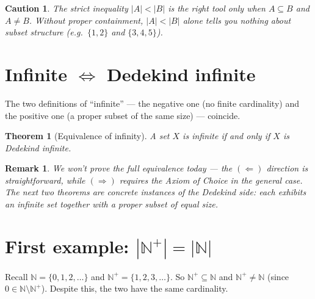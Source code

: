 \documentclass[11pt]{article}
\theoremstyle{defstyle}
\theoremstyle{thmstyle}
\newtheorem{theorem}{Theorem}[section]
\theoremstyle{notstyle}
\newtheorem*{remark}{Remark}
\theoremstyle{cautionstyle}
\newtheorem*{caution}{Caution}
\newcommand{\N}{\mathbb{N}}
\newcommand{\Np}{\mathbb{N}^{+}}
\begin{document}
\begin{cautionbox}
\begin{caution}
The strict inequality $|A| < |B|$ is the right tool only when $A \subseteq B$ and $A \neq B$. Without proper containment, $|A| < |B|$ alone tells you nothing about subset structure (e.g.\ $\{1,2\}$ and $\{3,4,5\}$).
\end{caution}
\end{cautionbox}

\section{Infinite \texorpdfstring{$\iff$}{iff} Dedekind infinite}

The two definitions of ``infinite'' --- the negative one (no finite cardinality) and the positive one (a proper subset of the same size) --- coincide.

\begin{thmbox}
\begin{theorem}[Equivalence of infinity]
A set $X$ is infinite if and only if $X$ is Dedekind infinite.
\end{theorem}
\end{thmbox}

\begin{notebox}
\begin{remark}
We won't prove the full equivalence today --- the $(\Leftarrow)$ direction is straightforward, while $(\Rightarrow)$ requires the Axiom of Choice in the general case. The next two theorems are concrete instances of the Dedekind side: each exhibits an infinite set together with a proper subset of equal size.
\end{remark}
\end{notebox}

\section{First example: \texorpdfstring{$|\Np| = |\N|$}{|N+|=|N|}}

Recall $\N = \{0, 1, 2, \ldots\}$ and $\Np = \{1, 2, 3, \ldots\}$. So $\Np \subseteq \N$ and $\Np \neq \N$ (since $0 \in \N \setminus \Np$). Despite this, the two have the same cardinality.
\end{document}
